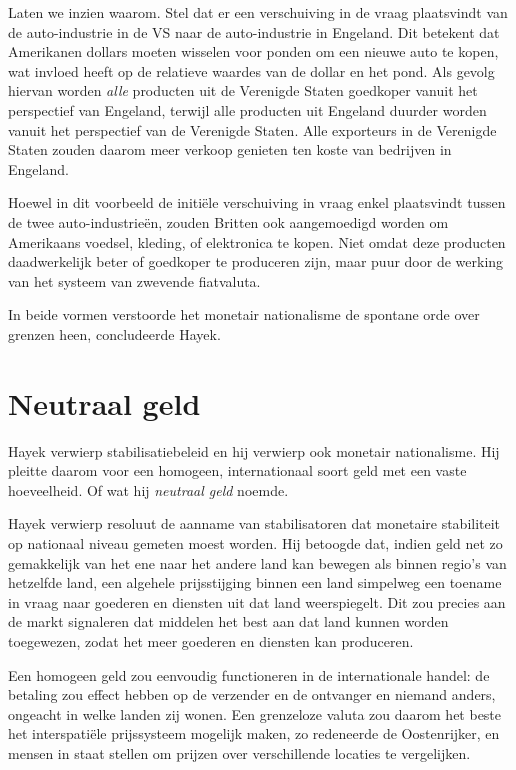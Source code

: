 \documentclass[
  a5paper,
  smalldemyvopaper,11pt,twoside,onecolumn,openright,extrafontsizes,
hidelinks]{memoir}
\begin{document}
Laten we inzien waarom. Stel dat er een verschuiving in de vraag
plaatsvindt van de auto-industrie in de VS naar de auto-industrie in
Engeland. Dit betekent dat Amerikanen dollars moeten wisselen voor
ponden om een nieuwe auto te kopen, wat invloed heeft op de relatieve
waardes van de dollar en het pond. Als gevolg hiervan worden \emph{alle}
producten uit de Verenigde Staten goedkoper vanuit het perspectief van
Engeland, terwijl alle producten uit Engeland duurder worden vanuit het
perspectief van de Verenigde Staten. Alle exporteurs in de Verenigde
Staten zouden daarom meer verkoop genieten ten koste van bedrijven in
Engeland.

Hoewel in dit voorbeeld de initiële verschuiving in vraag enkel
plaatsvindt tussen de twee auto-industrieën, zouden Britten ook
aangemoedigd worden om Amerikaans voedsel, kleding, of elektronica te
kopen. Niet omdat deze producten daadwerkelijk beter of goedkoper te
produceren zijn, maar puur door de werking van het systeem van zwevende
fiatvaluta.

In beide vormen verstoorde het monetair nationalisme de spontane orde
over grenzen heen, concludeerde Hayek.

\section{Neutraal geld}\label{neutraal-geld-1}

Hayek verwierp stabilisatiebeleid en hij verwierp ook monetair
nationalisme. Hij pleitte daarom voor een homogeen, internationaal soort
geld met een vaste hoeveelheid. Of wat hij \emph{neutraal geld} noemde.

Hayek verwierp resoluut de aanname van stabilisatoren dat monetaire
stabiliteit op nationaal niveau gemeten moest worden. Hij betoogde dat,
indien geld net zo gemakkelijk van het ene naar het andere land kan
bewegen als binnen regio's van hetzelfde land, een algehele
prijsstijging binnen een land simpelweg een toename in vraag naar
goederen en diensten uit dat land weerspiegelt. Dit zou precies aan de
markt signaleren dat middelen het best aan dat land kunnen worden
toegewezen, zodat het meer goederen en diensten kan produceren.

Een homogeen geld zou eenvoudig functioneren in de internationale
handel: de betaling zou effect hebben op de verzender en de ontvanger en
niemand anders, ongeacht in welke landen zij wonen. Een grenzeloze
valuta zou daarom het beste het interspatiële prijssysteem mogelijk
maken, zo redeneerde de Oostenrijker, en mensen in staat stellen om
prijzen over verschillende locaties te vergelijken.
\end{document}
